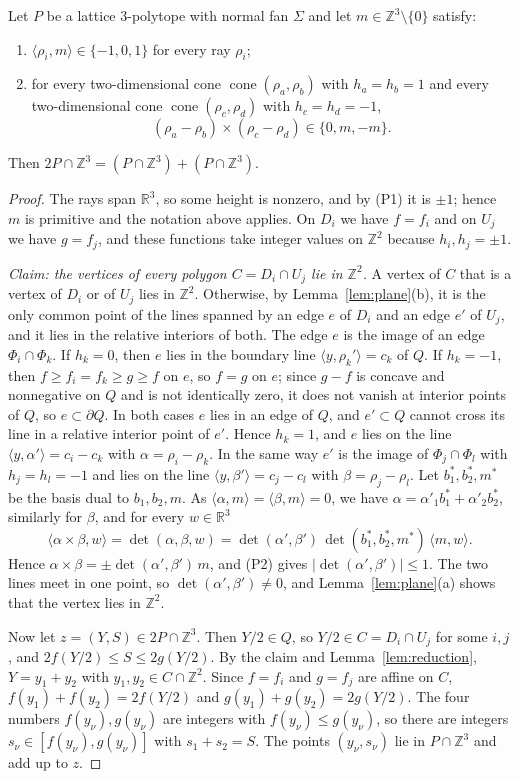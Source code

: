 \documentclass[12pt]{article}
\newcommand{\R}{\mathbb{R}}
\newcommand{\Z}{\mathbb{Z}}
\newcommand{\cone}{\operatorname{cone}}
\newcommand{\inn}[2]{\langle #1,#2\rangle}
\begin{document}
\begin{proposition}\label{prop:proj}
Let $P$ be a lattice $3$-polytope with normal fan $\Sigma$ and let $m\in\Z^3\setminus\{0\}$ satisfy:
\begin{enumerate}
\item[(P1)] $\inn{\rho_i}{m}\in\{-1,0,1\}$ for every ray $\rho_i$;
\item[(P2)] for every two-dimensional cone $\cone(\rho_a,\rho_b)$ with $h_a=h_b=1$ and every two-dimensional cone $\cone(\rho_c,\rho_d)$ with $h_c=h_d=-1$,
\[ (\rho_a-\rho_b)\times(\rho_c-\rho_d)\in\{0,m,-m\}. \]
\end{enumerate}
Then $2P\cap\Z^3=(P\cap\Z^3)+(P\cap\Z^3)$.
\end{proposition}

\begin{proof}
The rays span $\R^3$, so some height is nonzero, and by (P1) it is $\pm1$; hence $m$ is primitive and the notation above applies. On $D_i$ we have $f=f_i$ and on $U_j$ we have $g=f_j$, and these functions take integer values on $\Z^2$ because $h_i,h_j=\pm1$.

\emph{Claim: the vertices of every polygon $C=D_i\cap U_j$ lie in $\Z^2$.} A vertex of $C$ that is a vertex of $D_i$ or of $U_j$ lies in $\Z^2$. Otherwise, by Lemma~\ref{lem:plane}(b), it is the only common point of the lines spanned by an edge $e$ of $D_i$ and an edge $e'$ of $U_j$, and it lies in the relative interiors of both. The edge $e$ is the image of an edge $\Phi_i\cap\Phi_k$. If $h_k=0$, then $e$ lies in the boundary line $\inn{y}{\rho_k'}=c_k$ of $Q$. If $h_k=-1$, then $f\ge f_i=f_k\ge g\ge f$ on $e$, so $f=g$ on $e$; since $g-f$ is concave and nonnegative on $Q$ and is not identically zero, it does not vanish at interior points of $Q$, so $e\subset\partial Q$. In both cases $e$ lies in an edge of $Q$, and $e'\subset Q$ cannot cross its line in a relative interior point of $e'$. Hence $h_k=1$, and $e$ lies on the line $\inn{y}{\alpha'}=c_i-c_k$ with $\alpha=\rho_i-\rho_k$. In the same way $e'$ is the image of $\Phi_j\cap\Phi_l$ with $h_j=h_l=-1$ and lies on the line $\inn{y}{\beta'}=c_j-c_l$ with $\beta=\rho_j-\rho_l$. Let $b_1^*,b_2^*,m^*$ be the basis dual to $b_1,b_2,m$. As $\inn{\alpha}{m}=\inn{\beta}{m}=0$, we have $\alpha=\alpha'_1b_1^*+\alpha'_2b_2^*$, similarly for $\beta$, and for every $w\in\R^3$
\[ \inn{\alpha\times\beta}{w}=\det(\alpha,\beta,w)=\det(\alpha',\beta')\,\det(b_1^*,b_2^*,m^*)\,\inn{m}{w}. \]
Hence $\alpha\times\beta=\pm\det(\alpha',\beta')\,m$, and (P2) gives $|\det(\alpha',\beta')|\le1$. The two lines meet in one point, so $\det(\alpha',\beta')\ne0$, and Lemma~\ref{lem:plane}(a) shows that the vertex lies in $\Z^2$.

Now let $z=(Y,S)\in2P\cap\Z^3$. Then $Y/2\in Q$, so $Y/2\in C=D_i\cap U_j$ for some $i,j$, and $2f(Y/2)\le S\le2g(Y/2)$. By the claim and Lemma~\ref{lem:reduction}, $Y=y_1+y_2$ with $y_1,y_2\in C\cap\Z^2$. Since $f=f_i$ and $g=f_j$ are affine on $C$, $f(y_1)+f(y_2)=2f(Y/2)$ and $g(y_1)+g(y_2)=2g(Y/2)$. The four numbers $f(y_\nu),g(y_\nu)$ are integers with $f(y_\nu)\le g(y_\nu)$, so there are integers $s_\nu\in[f(y_\nu),g(y_\nu)]$ with $s_1+s_2=S$. The points $(y_\nu,s_\nu)$ lie in $P\cap\Z^3$ and add up to $z$.
\end{proof}
\end{document}
